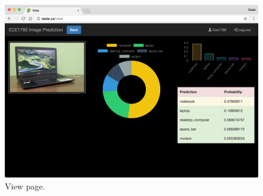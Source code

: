 \documentclass[conference]{IEEEtran}
\begin{document}
\begin{figure}[h!]
  \centering
  \includegraphics[width=\linewidth]{pc_view.png}
  \caption{View page.}
  \label{fig:pc_view}
\end{figure}

%
%

\end{document}
